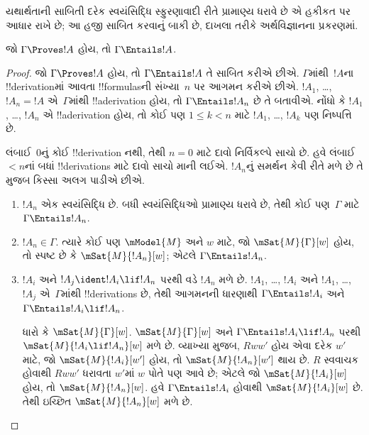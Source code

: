 \documentclass[../../../include/open-logic-section]{subfiles}
\begin{document}


\begin{editorial}
  યથાર્થતાની સાબિતી દરેક સ્વયંસિદ્ધિ સ્ફુરણાવાદી રીતે
  પ્રામાણ્ય ધરાવે છે એ હકીકત પર આધાર રાખે છે; આ હજી
  સાબિત કરવાનું બાકી છે, દાખલા તરીકે અર્થવિજ્ઞાનના પ્રકરણમાં.
\end{editorial}



\begin{thm}[યથાર્થતા]
  જો $\Gamma \Proves !A$ હોય, તો $ \Gamma \Entails !A$.
\end{thm}

\begin{proof}
  જો $\Gamma \Proves !A$ હોય, તો $\Gamma \Entails !A$
  તે સાબિત કરીએ છીએ. $\Gamma$માંથી~$!A$ના !!{derivation}માં
  આવતા !!{formula}sની સંખ્યા~$n$ પર આગમન કરીએ છીએ.
  $!A_1$, \dots, $!A_n = !A$ એ~$\Gamma$માંથી
  !!a{derivation} હોય, તો $\Gamma \Entails !A_n$ છે તે બતાવીએ.
  નોંધો કે $!A_1$, \dots, $!A_n$ એ !!a{derivation} હોય,
  તો કોઈ પણ $1\le k<n$ માટે $!A_1$, \dots, $!A_k$ પણ
  નિષ્પત્તિ છે.
  

  લંબાઈ~$0$નું કોઈ !!{derivation} નથી, તેથી $n=0$ માટે
  દાવો નિર્વિકલ્પે સાચો છે. હવે લંબાઈ~$<n$નાં બધાં
  !!{derivation}s માટે દાવો સાચો માની લઈએ. $!A_n$નું
  સમર્થન કેવી રીતે મળે છે તે મુજબ કિસ્સા અલગ પાડીએ છીએ.

  \begin{enumerate}
  \item $!A_n$ એક સ્વયંસિદ્ધિ છે. બધી સ્વયંસિદ્ધિઓ
    પ્રામાણ્ય ધરાવે છે, તેથી કોઈ પણ~$\Gamma$ માટે
    $\Gamma \Entails !A_n$.
  \item $!A_n \in \Gamma$. ત્યારે કોઈ પણ $\mModel{M}$
    અને $w$ માટે, જો $\mSat{M}{\Gamma}[w]$ હોય, તો
    સ્પષ્ટ છે કે $\mSat{M}{!A_n}[w]$; એટલે
    $\Gamma \Entails !A_n$.
  \item $!A_i$ અને $!A_j \ident !A_i \lif !A_n$ પરથી
    \MP{} વડે $!A_n$ મળે છે. $!A_1$, \dots, $!A_i$
    અને $!A_1$, \dots, $!A_j$ એ~$\Gamma$માંથી
    !!{derivation}s છે, તેથી આગમનની ધારણાથી
    $\Gamma \Entails !A_i$ અને
    $\Gamma \Entails !A_i \lif !A_n$.

    ધારો કે $\mSat{M}{\Gamma}[w]$. $\mSat{M}{\Gamma}[w]$
    અને
    $\Gamma \Entails !A_i \lif !A_n$ પરથી
    $\mSat{M}{!A_i \lif !A_n}[w]$ મળે છે. વ્યાખ્યા મુજબ,
    $Rww'$ હોય એવા દરેક $w'$ માટે, જો
    $\mSat{M}{!A_i}[w']$ હોય, તો
    $\mSat{M}{!A_n}[w']$ થાય છે. $R$ સ્વવાચક હોવાથી
    $Rww'$ ધરાવતા $w'$માં $w$ પોતે પણ આવે છે;
    એટલે જો $\mSat{M}{!A_i}[w]$ હોય, તો
    $\mSat{M}{!A_n}[w]$. હવે $\Gamma \Entails !A_i$
    હોવાથી $\mSat{M}{!A_i}[w]$ છે. તેથી ઇચ્છિત
    $\mSat{M}{!A_n}[w]$ મળે છે.
  \end{enumerate}
\end{proof}
\end{document}
